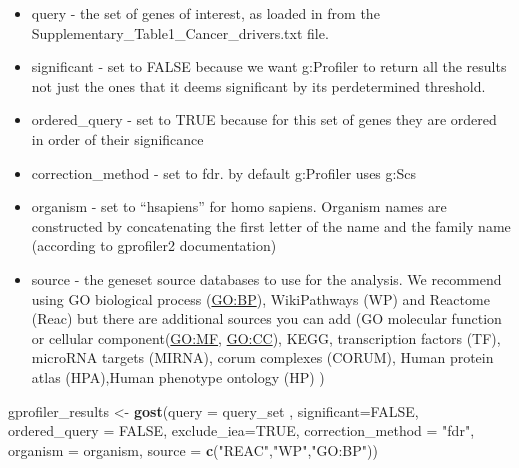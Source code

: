 \documentclass[
]{book}
\newenvironment{Shaded}{\begin{snugshade}}{\end{snugshade}}
\newcommand{\AttributeTok}[1]{\textcolor[rgb]{0.13,0.29,0.53}{#1}}
\newcommand{\CommentTok}[1]{\textcolor[rgb]{0.56,0.35,0.01}{\textit{#1}}}
\newcommand{\ConstantTok}[1]{\textcolor[rgb]{0.56,0.35,0.01}{#1}}
\newcommand{\DecValTok}[1]{\textcolor[rgb]{0.00,0.00,0.81}{#1}}
\newcommand{\FunctionTok}[1]{\textcolor[rgb]{0.13,0.29,0.53}{\textbf{#1}}}
\newcommand{\NormalTok}[1]{#1}
\newcommand{\OtherTok}[1]{\textcolor[rgb]{0.56,0.35,0.01}{#1}}
\newcommand{\SpecialCharTok}[1]{\textcolor[rgb]{0.81,0.36,0.00}{\textbf{#1}}}
\newcommand{\StringTok}[1]{\textcolor[rgb]{0.31,0.60,0.02}{#1}}
\providecommand{\tightlist}{%
  \setlength{\itemsep}{0pt}\setlength{\parskip}{0pt}}
\begin{document}
\begin{itemize}
\tightlist
\item
  query - the set of genes of interest, as loaded in from the Supplementary\_Table1\_Cancer\_drivers.txt file.
\item
  significant - set to FALSE because we want g:Profiler to return all the results not just the ones that it deems significant by its perdetermined threshold.
\item
  ordered\_query - set to TRUE because for this set of genes they are ordered in order of their significance
\item
  correction\_method - set to fdr. by default g:Profiler uses g:Scs
\item
  organism - set to ``hsapiens'' for homo sapiens. Organism names are constructed by concatenating the first letter of the name and the family name (according to gprofiler2 documentation)
\item
  source - the geneset source databases to use for the analysis. We recommend using GO biological process (\url{GO:BP}), WikiPathways (WP) and Reactome (Reac) but there are additional sources you can add (GO molecular function or cellular component(\url{GO:MF}, \url{GO:CC}), KEGG, transcription factors (TF), microRNA targets (MIRNA), corum complexes (CORUM), Human protein atlas (HPA),Human phenotype ontology (HP) )
\end{itemize}

\begin{Shaded}
\begin{Highlighting}[]
\NormalTok{gprofiler\_results }\OtherTok{\textless{}{-}} \FunctionTok{gost}\NormalTok{(}\AttributeTok{query =}\NormalTok{ query\_set ,}
                          \AttributeTok{significant=}\ConstantTok{FALSE}\NormalTok{,}
                          \AttributeTok{ordered\_query =} \ConstantTok{FALSE}\NormalTok{,}
                          \AttributeTok{exclude\_iea=}\ConstantTok{TRUE}\NormalTok{,}
                          \AttributeTok{correction\_method =} \StringTok{"fdr"}\NormalTok{,}
                          \AttributeTok{organism =}\NormalTok{ organism,}
                          \AttributeTok{source =} \FunctionTok{c}\NormalTok{(}\StringTok{"REAC"}\NormalTok{,}\StringTok{"WP"}\NormalTok{,}\StringTok{"GO:BP"}\NormalTok{))}
\end{Highlighting}
\end{Shaded}

\begin{Shaded}
\end{Shaded}
\end{document}
